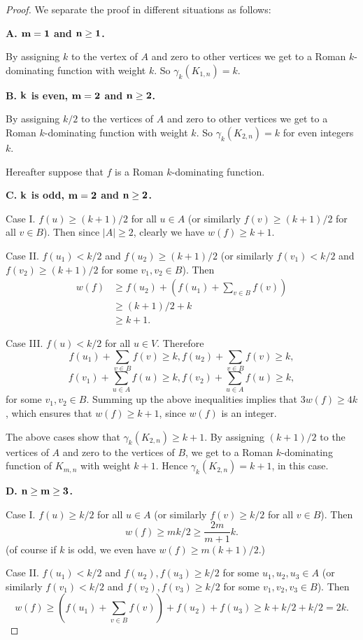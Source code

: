 \documentclass[10pt,a4paper]{amsart}
\begin{document}
\begin{proof}
We separate the proof in different situations as follows:

\textbf{A.  ${\bf m=1}$ and ${\bf n\geq 1}$.} 

By assigning $k$ to the vertex of $A$ and zero to other vertices we get to a Roman $k$-dominating function with weight $k$. So $\gamma_k (K_{1,n})=k$. 

\textbf{B. ${\bf k}$ is even, ${\bf m=2}$ and ${\bf n\geq 2}$.} 

By assigning $k/2$ to the vertices of $A$ and zero to other vertices we get to a Roman $k$-dominating function with weight $k$. So $\gamma_k (K_{2,n})=k$ for even integers $k$. 

Hereafter suppose that $f$ is a Roman $k$-dominating function.

\textbf{C. ${\bf k}$ is odd, ${\bf m=2}$ and ${\bf n\geq 2}$.} 

Case I. $f(u)\geq (k+1)/2$ for all $u\in A$ (or similarly $f(v)\geq (k+1)/2$ for all $v\in B$). Then since $|A|\geq 2$, clearly we have $w(f)\geq k+1$.

Case II.  $f(u_1)<k/2$ and $f(u_2)\geq (k+1)/2$ (or similarly $f(v_1)<k/2$ and $f(v_2)\geq (k+1)/2$ for some $v_1, v_2\in B$). Then 
\begin{align*}
w(f)&\geq f(u_2)+(f(u_1)+\sum_{v\in B}f(v))\\
&\geq (k+1)/2+k\\
&\geq k+1.
\end{align*}

Case III.  $f(u)<k/2$ for all $u\in V$. Therefore
$$f(u_1)+\sum_{v\in B}f(v)\geq k, f(u_2)+\sum_{v\in B}f(v)\geq k,$$
$$f(v_1)+\sum_{u\in A}f(u)\geq k, f(v_2)+\sum_{u\in A}f(u)\geq k,$$
for some $v_1, v_2\in B$.
Summing up the above inequalities implies that $3w(f)\geq 4k$, which ensures that $w(f)\geq k+1$, since $w(f)$ is an integer.

The above cases show that $\gamma_k(K_{2,n})\geq k+1$. By assigning $(k+1)/2$ to the vertices of $A$ and zero to the vertices of $B$, we get to a Roman $k$-dominating function of $K_{m,n}$ with weight $k+1$. Hence $\gamma_k(K_{2,n})=k+1$,
in this case.


\textbf{D. ${\bf n\geq m\geq 3}$.}

Case I.  $f(u)\geq k/2$ for all $u\in A$ (or similarly $f(v)\geq k/2$ for all $v\in B$). Then 
$$w(f)\geq mk/2\geq \frac{2m}{m+1}k.$$
(of course if $k$ is odd, we even have  $w(f)\geq m(k+1)/2$.)

Case II.  $f(u_1)<k/2$ and $f(u_2), f(u_3)\geq k/2$ for some $u_1, u_2, u_3\in A$ (or similarly  $f(v_1)<k/2$ and  $f(v_2), f(v_3)\geq k/2$ for some $v_1, v_2,v_3\in B$). Then 
$$w(f)\geq (f(u_1)+\sum_{v\in B}f(v))+f(u_2)+f(u_3)\geq k+k/2+k/2=2k.$$


\end{proof}
\end{document}
